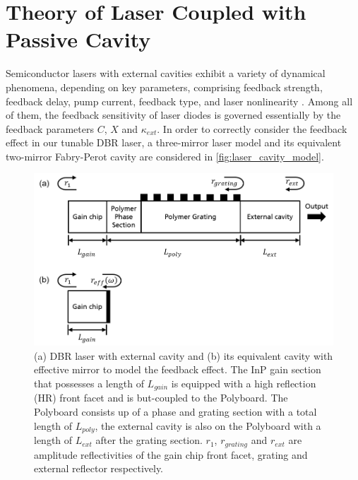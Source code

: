 \chapter{Theory of Laser Coupled with Passive Cavity}
\label{ch:Theory}
Semiconductor lasers with external cavities exhibit a variety of dynamical phenomena, depending on key parameters, comprising feedback strength, feedback delay, pump current, feedback type, and laser nonlinearity \cite{soriano2013complex}. Among all of them, the feedback sensitivity of laser diodes is governed essentially by the feedback parameters $C$, $X$ and $\kappa_{ext}$. In order to correctly consider the feedback effect in our tunable DBR laser, a three-mirror laser model and its equivalent two-mirror Fabry-Perot cavity are considered in \autoref{fig:laser_cavity_model}.

\begin{figure}[ht]
    \centering
    \includegraphics[width=.9\linewidth]{figures/laser_cavity_model.png}
    \caption{(a) DBR laser with external cavity and (b) its equivalent cavity with effective mirror to model the feedback effect. The InP gain section that possesses a length of $L_{gain}$ is equipped with a high reflection (HR) front facet and is but-coupled to the Polyboard. The Polyboard consists up of a phase and grating section with a total length of $L_{poly}$, the external cavity is also on the Polyboard with a length of $L_{ext}$ after the grating section. $r_1$, $r_{grating}$ and $r_{ext}$ are amplitude reflectivities of the gain chip front facet, grating and external reflector respectively.}
    \label{fig:laser_cavity_model}
\end{figure}

